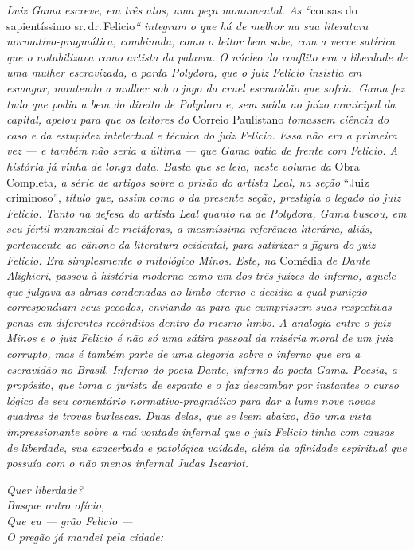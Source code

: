 \begin{argumento}
\emph{Luiz Gama escreve, em três atos, uma peça monumental. As ``}cousas
do sapientíssimo sr.\,dr.\,Felicio\emph{`` integram o que há de melhor na
sua literatura normativo-pragmática, combinada, como o leitor bem sabe,
com a verve satírica que o notabilizava como artista da palavra. O
núcleo do conflito era a liberdade de uma mulher escravizada, a parda
Polydora, que o juiz Felicio insistia em esmagar, mantendo a mulher sob
o jugo da cruel escravidão que sofria. Gama fez tudo que podia a bem do
direito de Polydora e, sem saída no juízo municipal da capital, apelou
para que os leitores do} Correio Paulistano \emph{tomassem ciência do
caso e da estupidez intelectual e técnica do juiz Felicio. Essa não era
a primeira vez --- e também não seria a última --- que Gama batia de
frente com Felicio. A história já vinha de longa data. Basta que se
leia, neste volume da} Obra Completa\emph{, a série de artigos sobre a
prisão do artista Leal, na seção} ``Juiz criminoso'', \emph{título que,
assim como o da presente seção, prestigia o legado do juiz Felicio.
Tanto na defesa do artista Leal quanto na de Polydora, Gama buscou, em
seu fértil manancial de metáforas, a mesmíssima referência literária,
aliás, pertencente ao cânone da literatura ocidental, para satirizar a
figura do juiz Felicio. Era simplesmente o mitológico Minos. Este, na}
Comédia \emph{de Dante Alighieri, passou à história moderna como um dos
três juízes do inferno, aquele que julgava as almas condenadas ao limbo
eterno e decidia a qual punição correspondiam seus pecados, enviando-as
para que cumprissem suas respectivas penas em diferentes recônditos
dentro do mesmo limbo. A analogia entre o juiz Minos e o juiz Felicio é
não só uma sátira pessoal da miséria moral de um juiz corrupto, mas é
também parte de uma alegoria sobre o inferno que era a escravidão no
Brasil. Inferno do poeta Dante, inferno do poeta Gama. Poesia, a
propósito, que toma o jurista de espanto e o faz descambar por instantes
o curso lógico de seu comentário normativo-pragmático para dar a lume
nove novas quadras de trovas burlescas. Duas delas, que se leem abaixo,
dão uma vista impressionante sobre a má vontade infernal que o juiz
Felicio tinha com causas de liberdade, sua exacerbada e patológica
vaidade, além da afinidade espiritual que possuía com o não menos
infernal Judas Iscariot.}
\end{argumento}

\emph{Quer liberdade?\\
Busque outro ofício,\\
Que eu --- grão Felicio ---\\
O pregão já mandei pela cidade:}

